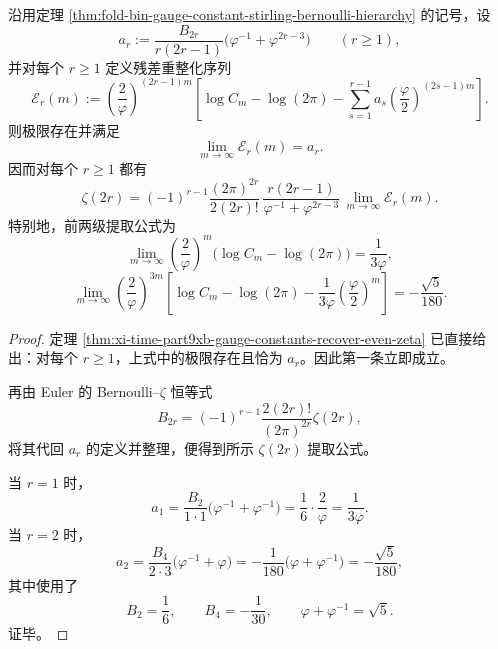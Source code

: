 \begin{theorem}\label{thm:xi-time-part9xe-gauge-residual-even-zeta-extraction}
沿用定理 \ref{thm:fold-bin-gauge-constant-stirling-bernoulli-hierarchy} 的记号，设
\[
a_r:=
\frac{B_{2r}}{r(2r-1)}
\bigl(\varphi^{-1}+\varphi^{2r-3}\bigr)
\qquad (r\ge 1),
\]
并对每个 \(r\ge 1\) 定义残差重整化序列
\[
\mathcal E_r(m):=
\left(\frac{2}{\varphi}\right)^{(2r-1)m}
\left[
\log C_m-\log(2\pi)-\sum_{s=1}^{r-1}a_s
\left(\frac{\varphi}{2}\right)^{(2s-1)m}
\right].
\]
则极限存在并满足
\[
\lim_{m\to\infty}\mathcal E_r(m)=a_r.
\]
因而对每个 \(r\ge 1\) 都有
\[
\zeta(2r)
=
(-1)^{r-1}\frac{(2\pi)^{2r}}{2(2r)!}\,
\frac{r(2r-1)}{\varphi^{-1}+\varphi^{2r-3}}\,
\lim_{m\to\infty}\mathcal E_r(m).
\]
特别地，前两级提取公式为
\[
\lim_{m\to\infty}
\left(\frac{2}{\varphi}\right)^m
\bigl(\log C_m-\log(2\pi)\bigr)
=
\frac{1}{3\varphi},
\]
\[
\lim_{m\to\infty}
\left(\frac{2}{\varphi}\right)^{3m}
\left[
\log C_m-\log(2\pi)-\frac{1}{3\varphi}\left(\frac{\varphi}{2}\right)^m
\right]
=
-\frac{\sqrt5}{180}.
\]
\end{theorem}
\begin{proof}
定理 \ref{thm:xi-time-part9xb-gauge-constants-recover-even-zeta} 已直接给出：对每个 \(r\ge 1\)，上式中的极限存在且恰为 \(a_r\)。因此第一条立即成立。

再由 Euler 的 Bernoulli--\(\zeta\) 恒等式
\[
B_{2r}
=
(-1)^{r-1}\frac{2(2r)!}{(2\pi)^{2r}}\zeta(2r),
\]
将其代回 \(a_r\) 的定义并整理，便得到所示 \(\zeta(2r)\) 提取公式。

当 \(r=1\) 时，
\[
a_1=\frac{B_2}{1\cdot 1}\bigl(\varphi^{-1}+\varphi^{-1}\bigr)
=
\frac{1}{6}\cdot\frac{2}{\varphi}
=
\frac{1}{3\varphi}.
\]
当 \(r=2\) 时，
\[
a_2
=
\frac{B_4}{2\cdot 3}\bigl(\varphi^{-1}+\varphi\bigr)
=
-\frac{1}{180}\bigl(\varphi+\varphi^{-1}\bigr)
=
-\frac{\sqrt5}{180},
\]
其中使用了
\[
B_2=\frac16,
\qquad
B_4=-\frac1{30},
\qquad
\varphi+\varphi^{-1}=\sqrt5.
\]
证毕。
\end{proof}

